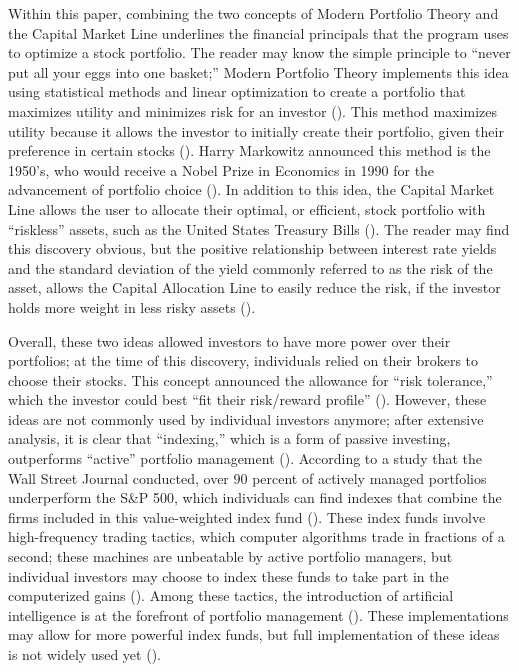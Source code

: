 \documentclass[12pt,english]{article}
\begin{document}
\begin{doublespace}
        Within this paper, combining the two concepts of Modern Portfolio Theory and the Capital Market Line underlines the financial principals that the program uses to optimize a stock portfolio. The reader may know the simple principle to “never put all your eggs into one basket;” Modern Portfolio Theory implements this idea using statistical methods and linear optimization to create a portfolio that maximizes utility and minimizes risk for an investor (\citet{Simon2008}). This method maximizes utility because it allows the investor to initially create their portfolio, given their preference in certain stocks (\citet{Simon2008}). Harry Markowitz announced this method is the 1950’s, who would receive a Nobel Prize in Economics in 1990 for the advancement of portfolio choice (\citet{Simon2008}). In addition to this idea, the Capital Market Line allows the user to allocate their optimal, or efficient, stock portfolio with “riskless” assets, such as the United States Treasury Bills (\citet{Simon2008}). The reader may find this discovery obvious, but the positive relationship between interest rate yields and the standard deviation of the yield commonly referred to as the risk of the asset, allows the Capital Allocation Line to easily reduce the risk, if the investor holds more weight in less risky assets (\citet{Simon2008}). 
        
        \indent{}\indent{} 
        Overall, these two ideas allowed investors to have more power over their portfolios; at the time of this discovery, individuals relied on their brokers to choose their stocks. This concept announced the allowance for “risk tolerance,” which the investor could best “fit their risk/reward profile” (\citet{Beatti2020}). However, these ideas are not commonly used by individual investors anymore; after extensive analysis, it is clear that “indexing,” which is a form of passive investing, outperforms “active” portfolio management (\citet{Malkie2017}). According to a study that the Wall Street Journal conducted, over 90 percent of actively managed portfolios underperform the S&P 500, which individuals can find indexes that combine the firms included in this value-weighted index fund (\citet{Malkie2017}). These index funds involve high-frequency trading tactics, which computer algorithms trade in fractions of a second; these machines are unbeatable by active portfolio managers, but individual investors may choose to index these funds to take part in the computerized gains (\citet{Patter2020}). Among these tactics, the introduction of artificial intelligence is at the forefront of portfolio management (\citet{Aenlle2018}). These implementations may allow for more powerful index funds, but full implementation of these ideas is not widely used yet (\citet{Aenlle2018}).
        

\end{doublespace}
\end{document}

